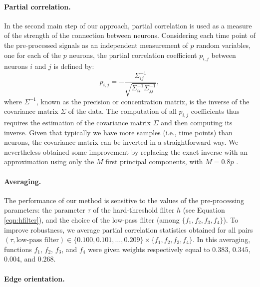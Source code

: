 \documentclass[wcp]{jmlr}
\begin{document}
\paragraph{Partial correlation.}
In the second main step of our approach, partial correlation is used as a
measure of the strength of the connection between neurons. Considering each
time point of the pre-processed signals as an independent measurement
of $p$ random variables, one for each of the $p$ neurons,
the partial correlation coefficient $p_{i,j}$ between neurons $i$ and $j$ is
defined by:
\begin{equation}
p_{i,j} =
-\frac{\Sigma^{-1}_{ij}}{\sqrt{\Sigma^{-1}_{ii} \Sigma^{-1}_{jj}}}, \label{eq:inverse}
\end{equation}
where $\Sigma^{-1}$, known as the precision or concentration matrix, is the
inverse of the covariance matrix $\Sigma$ of the data. The computation of all
$p_{i,j}$ coefficients thus requires the estimation of the covariance matrix
$\Sigma$ and then computing its inverse. Given that typically we have more
samples (i.e., time points) than neurons, the covariance matrix can be inverted
in a straightforward way. We nevertheless obtained some improvement by
replacing the exact inverse with an approximation using only the $M$ first
principal components, with $M=0.8p$ \citep{bishop2006pattern}.

\paragraph{Averaging.}
The performance of our method is sensitive to the values of the pre-processing
parameters: the parameter $\tau$ of the hard-threshold filter $h$ (see Equation
\ref{eqn:hfilter}), and the choice of the low-pass filter (among $\{f_1,
f_2, f_3, f_4\}$). To improve robustness, we average partial correlation
statistics obtained for all pairs $(\tau,\mbox{low-pass filter}) \in
\{0.100,0.101,\ldots,0.209\}\times \{f_1, f_2, f_3, f_4\}$. In this averaging,
functions $f_1$, $f_2$, $f_3$, and $f_4$ were given weights respectively equal
to $0.383$, $0.345$, $0.004$, and $0.268$.

\paragraph{Edge orientation.}
\end{document}
